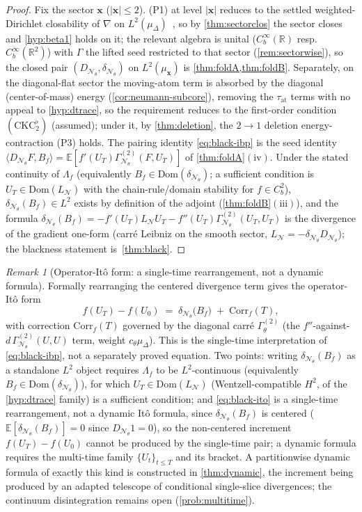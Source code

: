\documentclass[reqno,final,11pt]{amsart}
\theoremstyle{plain}
\theoremstyle{definition}
\theoremstyle{remark}
\newtheorem{remark}[theorem]{Remark}
\newcommand{\R}{\mathbb R}
\newcommand{\E}{\mathbb E}
\newcommand{\Dom}{\mathrm{Dom}}
\newcommand{\cN}{\mathcal N}
\newcommand{\GamT}{\Gamma^{(2)}_{\theta}}
\newcommand{\GamN}{\Gamma^{(2)}_{\cN_\theta}}
\newcommand{\DN}{D_{\cN_\theta}}
\newcommand{\divN}{\delta_{\cN_\theta}}
\newcommand{\muD}{\mu_{\Delta}}
\newcommand{\cth}{c_{\theta}}
\begin{document}
\begin{proof}
Fix the sector $\mathbf x$ ($|\mathbf x|\le2$). (P1) at level $|\mathbf x|$
reduces to the settled weighted-Dirichlet closability of $\nabla$ on
$L^2(\muD)$~\citep{FOT}, so by \cref{thm:sectorclos} the sector closes and
\cref{hyp:beta1} holds on it; the relevant algebra is unital
($C_b^\infty(\R)$ resp.\ $C_b^\infty(\R^2)$) with $\Gamma$ the lifted seed
restricted to that sector (\cref{rem:sectorwise}), so the closed pair
$(\DN,\divN)$ on $L^2(\mu_{\mathbf x})$ is \cref{thm:foldA,thm:foldB}. Separately, on
the diagonal-flat sector the moving-atom term is absorbed by the diagonal
(center-of-mass) energy (\cref{cor:neumann-subcore}), removing the
$\tau_{\mathrm{at}}$ terms with no appeal to \cref{hyp:dtrace}, so the requirement
reduces to the first-order condition $(\mathrm{CKC}_2^{\flat})$ (assumed); under
it, by \cref{thm:deletion}, the $2\to1$ deletion energy-contraction (P3) holds. The pairing identity \eqref{eq:black-ibp} is the seed identity
$\langle\DN F,B_f\rangle=\E[f'(U_T)\GamN(F,U_T)]$ of \cref{thm:foldA}$(\mathrm{iv})$.
Under the stated continuity of $\Lambda_f$ (equivalently $B_f\in\Dom(\divN)$; a
sufficient condition is $U_T\in\Dom(L_{\cN})$ with the chain-rule/domain
stability for $f\in C_b^2$), $\divN(B_f)\in L^2$ exists by definition of
the adjoint (\cref{thm:foldB}$(\mathrm{iii})$), and the formula
$\divN(B_f)=-f'(U_T)L_{\cN}U_T-f''(U_T)\GamN(U_T,U_T)$ is the divergence of the
gradient one-form (carr\'e Leibniz on the smooth sector, $L_{\cN}=-\divN\DN$); the
blackness statement is~\cref{thm:black}.
\end{proof}

\begin{remark}[Operator-It\^o form: a single-time rearrangement, not a dynamic formula]\label{rem:ito-form}
Formally rearranging the centered divergence term gives the operator-It\^o
form
\begin{equation}\label{eq:black-ito}
  f(U_T)-f(U_0)\;=\;\divN\bigl(B_f\bigr)\;+\;\mathrm{Corr}_f(T),
\end{equation}
with correction $\mathrm{Corr}_f(T)$ governed by the diagonal carr\'e $\GamT$
(the $f''$-against-$d\,\GamN(U,U)$ term, weight $\cth\muD$). This is the
single-time interpretation of \eqref{eq:black-ibp}, not a separately proved
equation. Two points: writing $\divN(B_f)$ as a standalone $L^2$ object requires
$\Lambda_f$ to be $L^2$-continuous (equivalently $B_f\in\Dom(\divN)$), for which
$U_T\in\Dom(L_{\cN})$ (Wentzell-compatible $H^2$, of the \cref{hyp:dtrace}
family) is a sufficient condition; and \eqref{eq:black-ito} is a single-time
rearrangement, not a
dynamic It\^o formula, since $\divN(B_f)$ is centered ($\E[\divN(B_f)]=0$ since
$\DN 1=0$), so the non-centered increment $f(U_T)-f(U_0)$ cannot be produced by
the single-time pair; a dynamic formula requires the multi-time family
$\{U_t\}_{t\le T}$ and its bracket. A partitionwise dynamic formula of exactly
this kind is constructed in \cref{thm:dynamic}, the increment being produced
by an adapted telescope of conditional single-slice divergences; the
continuum disintegration remains open (\cref{prob:multitime}).
\end{remark}
\end{document}

